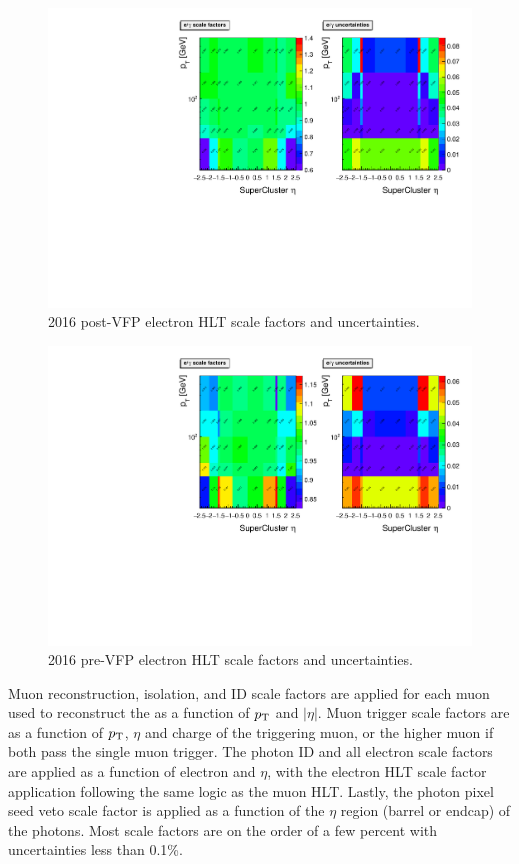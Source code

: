 \begin{figure}[htb!]
	\centering
	\includegraphics[width=0.85\linewidth]{figs/05_analysis/UL2016_postVFP_SF2D_myWP.pdf}
	\caption[2016 post-VFP electron HLT scale factors and uncertainties.]{2016 post-VFP electron HLT scale factors and uncertainties.}
	\label{fig:UL2016_postVFP_SF2D}
\end{figure}

\begin{figure}[htb!]
	\centering
	\includegraphics[width=0.85\linewidth]{figs/05_analysis/UL2016_preVFP_SF2D_myWP.pdf}
	\caption[2016 pre-VFP electron HLT scale factors and uncertainties.]{2016 pre-VFP electron HLT scale factors and uncertainties.}
	\label{fig:UL2016_preVFP_SF2D}
\end{figure}

Muon reconstruction, isolation, and ID scale factors are applied for each muon used to reconstruct the \VZ as a function of $p_\mathrm{T}$ and $|\eta|$. Muon trigger scale factors are as a function of $p_\mathrm{T}$, $\eta$ and charge of the triggering muon, or the higher \pt muon if both pass the single muon trigger. The photon ID and all electron scale factors are applied as a function of electron \pt and $\eta$, with the electron HLT scale factor application following the same logic as the muon HLT. Lastly, the photon pixel seed veto scale factor is applied as a function of the $\eta$ region (barrel or endcap) of the photons. Most scale factors are on the order of a few percent with uncertainties less than 0.1\%.


